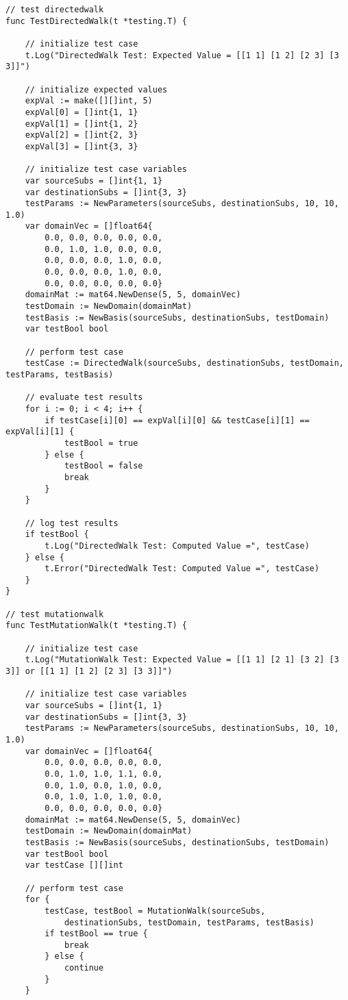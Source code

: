 \begin{lstlisting}[basicstyle=\tiny]
// test directedwalk
func TestDirectedWalk(t *testing.T) {

	// initialize test case
	t.Log("DirectedWalk Test: Expected Value = [[1 1] [1 2] [2 3] [3 3]]")

	// initialize expected values
	expVal := make([][]int, 5)
	expVal[0] = []int{1, 1}
	expVal[1] = []int{1, 2}
	expVal[2] = []int{2, 3}
	expVal[3] = []int{3, 3}

	// initialize test case variables
	var sourceSubs = []int{1, 1}
	var destinationSubs = []int{3, 3}
	testParams := NewParameters(sourceSubs, destinationSubs, 10, 10, 1.0)
	var domainVec = []float64{
		0.0, 0.0, 0.0, 0.0, 0.0,
		0.0, 1.0, 1.0, 0.0, 0.0,
		0.0, 0.0, 0.0, 1.0, 0.0,
		0.0, 0.0, 0.0, 1.0, 0.0,
		0.0, 0.0, 0.0, 0.0, 0.0}
	domainMat := mat64.NewDense(5, 5, domainVec)
	testDomain := NewDomain(domainMat)
	testBasis := NewBasis(sourceSubs, destinationSubs, testDomain)
	var testBool bool

	// perform test case
	testCase := DirectedWalk(sourceSubs, destinationSubs, testDomain, testParams, testBasis)

	// evaluate test results
	for i := 0; i < 4; i++ {
		if testCase[i][0] == expVal[i][0] && testCase[i][1] == expVal[i][1] {
			testBool = true
		} else {
			testBool = false
			break
		}
	}

	// log test results
	if testBool {
		t.Log("DirectedWalk Test: Computed Value =", testCase)
	} else {
		t.Error("DirectedWalk Test: Computed Value =", testCase)
	}
}

// test mutationwalk
func TestMutationWalk(t *testing.T) {

	// initialize test case
	t.Log("MutationWalk Test: Expected Value = [[1 1] [2 1] [3 2] [3 3]] or [[1 1] [1 2] [2 3] [3 3]]")

	// initialize test case variables
	var sourceSubs = []int{1, 1}
	var destinationSubs = []int{3, 3}
	testParams := NewParameters(sourceSubs, destinationSubs, 10, 10, 1.0)
	var domainVec = []float64{
		0.0, 0.0, 0.0, 0.0, 0.0,
		0.0, 1.0, 1.0, 1.1, 0.0,
		0.0, 1.0, 0.0, 1.0, 0.0,
		0.0, 1.0, 1.0, 1.0, 0.0,
		0.0, 0.0, 0.0, 0.0, 0.0}
	domainMat := mat64.NewDense(5, 5, domainVec)
	testDomain := NewDomain(domainMat)
	testBasis := NewBasis(sourceSubs, destinationSubs, testDomain)
	var testBool bool
	var testCase [][]int

	// perform test case
	for {
		testCase, testBool = MutationWalk(sourceSubs, 
		    destinationSubs, testDomain, testParams, testBasis)
		if testBool == true {
			break
		} else {
			continue
		}
	}


\end{lstlisting}
